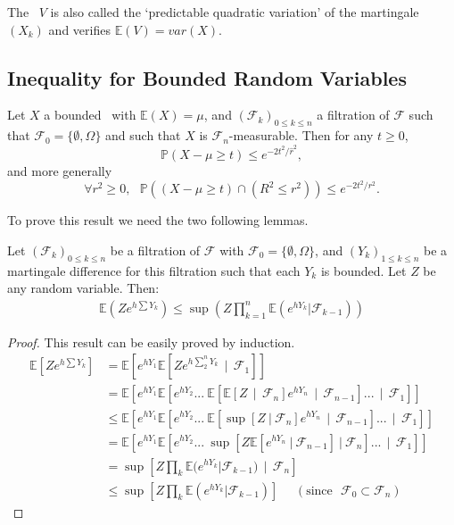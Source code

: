 The \rv~$V$ is also called the `predictable quadratic variation' of the martingale $(X_k)$ and verifies $\mathbb{E}(V)= var(X)$.


\subsection{Inequality for Bounded Random Variables}

\begin{theorem}
\label{3.14}
Let $X$ a bounded \rv~with $\mathbb{E}(X)=\mu$, and $(\mathcal{F}_k)_{0\leq k \leq n}$ a filtration of $\mathcal{F}$ such that $ \mathcal{F}_0 =  \{\emptyset , \Omega\} $ and such that $X$ is $\mathcal{F}_n$-measurable. 
Then for any $t \geq 0$, $$\mathbb{P}(X-\mu \geq t) \leq e^{-2t^2/\hat r^2},$$ and more generally $$\forall r^2 \geq 0,~~~ \mathbb{P}((X-\mu \geq t)\cap(R^2 \leq r^2)) \leq e^{-2t^2/ r^2}.$$
\end{theorem}

To prove this result we need the two following lemmas.


\begin{lemma}
 \label{lemme_mg}
Let $(\mathcal{F}_k)_{0\leq k \leq n}$ be a filtration of $\mathcal{F}$ with $ \mathcal{F}_0 =  \{\emptyset , \Omega\} $, and $(Y_k)_{1 \leq k \leq n}$ be a martingale difference for this filtration such that each $Y_k$ is bounded. Let $Z$ be any random variable. Then:
\begin{align*} \mathbb{E}(Z e^{h\sum Y_k}) \leq \sup(Z \prod_{k=1}^n \mathbb{E}(e^{hY_k}|\mathcal{F}_{k-1} ))
\end{align*}
\end{lemma}
\begin{proof}
This result can be easily proved by induction.
\begin{align*}
\mathbb{E}\left[Z e^{h\sum Y_k}\right] &= \mathbb{E}\left[e^{hY_1}\mathbb{E}\left[ Z e^{h\sum_{2}^n Y_k} ~~|~~ \mathcal{F}_1\right]\right]  \\ &= \mathbb{E}\left[e^{hY_1}\mathbb{E}\left[ e^{hY_2} ...~ \mathbb{E}\left[ \mathbb{E}\left[ Z ~~|~~ \mathcal{F}_n \right] e^{hY_n} ~~|~~ \mathcal{F}_{n-1} \right] ... ~~|~~\mathcal{F}_1 \right] \right]
\\ &\le \mathbb{E}\left[e^{hY_1}\mathbb{E}\left[ e^{hY_2} ...~ \mathbb{E}\left[ \sup\left[ Z ~|~ \mathcal{F}_n \right] e^{hY_n} ~~|~~ \mathcal{F}_{n-1} \right] ... ~~|~~\mathcal{F}_1 \right] \right]
\\ &= \mathbb{E}\left[e^{hY_1}\mathbb{E}\left[ e^{hY_2} ...~  \sup\left[ Z\mathbb{E}\left[e^{hY_n} ~|~ \mathcal{F}_{n-1} \right] ~|~ \mathcal{F}_n \right]  ... ~~|~~\mathcal{F}_1 \right] \right]
\\ &= \sup\left[Z \prod_{k} \mathbb{E}(e^{hY_k}|\mathcal{F}_{k-1} )~~|~~ \mathcal{F}_n\right]
\\ &\le \sup\left[Z \prod_{k} \mathbb{E}(e^{hY_k}|\mathcal{F}_{k-1} )\right]~~~~~~(\text{since~~} \mathcal{F}_0 \subset \mathcal{F}_n)
\end{align*}
\end{proof}

